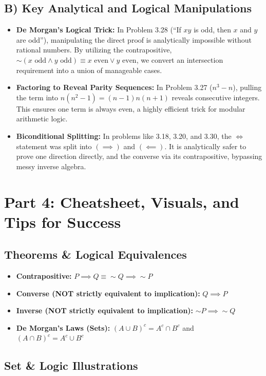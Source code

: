 \documentclass[11pt]{article}
\begin{document}
\subsection{B) Key Analytical and Logical Manipulations}
\begin{itemize}
    \item \textbf{De Morgan's Logical Trick:} In Problem 3.28 (``If $xy$ is odd, then $x$ and $y$ are odd''), manipulating the direct proof is analytically impossible without rational numbers. By utilizing the contrapositive, $\sim(x \text{ odd} \land y \text{ odd}) \equiv x \text{ even} \lor y \text{ even}$, we convert an intersection requirement into a union of manageable cases.
    \item \textbf{Factoring to Reveal Parity Sequences:} In Problem 3.27 ($n^3-n$), pulling the term into $n(n^2-1) = (n-1)n(n+1)$ reveals consecutive integers. This ensures one term is always even, a highly efficient trick for modular arithmetic logic.
    \item \textbf{Biconditional Splitting:} In problems like 3.18, 3.20, and 3.30, the $\iff$ statement was split into $(\implies)$ and $(\impliedby)$. It is analytically safer to prove one direction directly, and the converse via its contrapositive, bypassing messy inverse algebra.
\end{itemize}

\section{Part 4: Cheatsheet, Visuals, and Tips for Success}

\subsection{Theorems \& Logical Equivalences}
\begin{itemize}
    \item \textbf{Contrapositive:} $P \implies Q \equiv \sim Q \implies \sim P$
    \item \textbf{Converse (NOT strictly equivalent to implication):} $Q \implies P$
    \item \textbf{Inverse (NOT strictly equivalent to implication):} $\sim P \implies \sim Q$
    \item \textbf{De Morgan's Laws (Sets):} $(A \cup B)^c = A^c \cap B^c$ and $(A \cap B)^c = A^c \cup B^c$
\end{itemize}

\subsection{Set \& Logic Illustrations}
\end{document}
